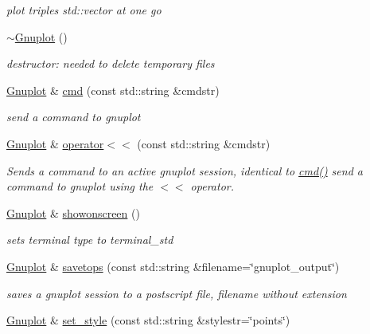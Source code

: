 \begin{DoxyCompactItemize}
\begin{DoxyCompactList}\small\item\em plot triples std\-::vector at one go \end{DoxyCompactList}\item 
\hyperlink{classGnuplot_a78a68f621caa87d1f34324fcd093c7bd}{$\sim$\-Gnuplot} ()
\begin{DoxyCompactList}\small\item\em destructor\-: needed to delete temporary files \end{DoxyCompactList}\item 
\hyperlink{classGnuplot}{\-Gnuplot} \& \hyperlink{classGnuplot_a07607803ede8dd5416906df0a1924fc5}{cmd} (const std\-::string \&cmdstr)
\begin{DoxyCompactList}\small\item\em send a command to gnuplot \end{DoxyCompactList}\item 
\hyperlink{classGnuplot}{\-Gnuplot} \& \hyperlink{classGnuplot_afb69631c7a498077e378a3cbb56f38c8}{operator$<$$<$} (const std\-::string \&cmdstr)
\begin{DoxyCompactList}\small\item\em \-Sends a command to an active gnuplot session, identical to \hyperlink{classGnuplot_a07607803ede8dd5416906df0a1924fc5}{cmd()} send a command to gnuplot using the $<$$<$ operator. \end{DoxyCompactList}\item 
\hyperlink{classGnuplot}{\-Gnuplot} \& \hyperlink{classGnuplot_a356d2faaa79f08d13fec9718b776b28d}{showonscreen} ()
\begin{DoxyCompactList}\small\item\em sets terminal type to terminal\-\_\-std \end{DoxyCompactList}\item 
\hyperlink{classGnuplot}{\-Gnuplot} \& \hyperlink{classGnuplot_a032072c7c01b508a7535a17fb08562b1}{savetops} (const std\-::string \&filename=\char`\"{}gnuplot\-\_\-output\char`\"{})
\begin{DoxyCompactList}\small\item\em saves a gnuplot session to a postscript file, filename without extension \end{DoxyCompactList}\item 
\hyperlink{classGnuplot}{\-Gnuplot} \& \hyperlink{classGnuplot_acfdcda292650775ebed4683e8e1515b5}{set\-\_\-style} (const std\-::string \&stylestr=\char`\"{}points\char`\"{})
\item 

\end{DoxyCompactItemize}
